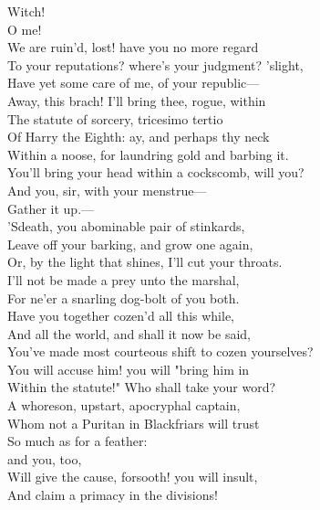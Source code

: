 \documentclass[a4paper,oneside]{memoir}
\begin{document}
\begin{drama*}
\facespeaks {} Witch!\\
\dolspeaks {} O me!\\
We are ruin'd, lost! have you no more regard\\
To your reputations? where's your judgment? 'slight,\\
Have yet some care of me, of your republic---\\
\facespeaks Away, this brach! I'll bring thee, rogue, within\\
The statute of sorcery, tricesimo tertio\\
Of Harry the Eighth: ay, and perhaps thy neck\\
Within a noose, for laundring gold and barbing it.\\
\dolspeaks {} You'll bring your head within a cockscomb, will you?\\
And you, sir, with your menstrue---\\
 Gather it up.---\\
'Sdeath, you abominable pair of stinkards,\\
Leave off your barking, and grow one again,\\
Or, by the light that shines, I'll cut your throats.\\
I'll not be made a prey unto the marshal,\\
For ne'er a snarling dog-bolt of you both.\\
Have you together cozen'd all this while,\\
And all the world, and shall it now be said,\\
You've made most courteous shift to cozen yourselves?\\
You will accuse him! you will "bring him in\\
Within the statute!" Who shall take your word?\\
A whoreson, upstart, apocryphal captain,\\
Whom not a Puritan in Blackfriars will trust\\
So much as for a feather:\\
 and you, too,\\
Will give the cause, forsooth! you will insult,\\
And claim a primacy in the divisions!\\

\end{drama*}
\end{document}
